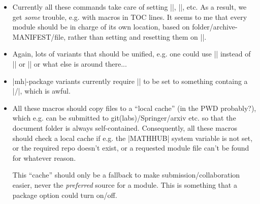 \documentclass{bluenote}
\begin{document}
\begin{itemize}
  \item Currently all these commands take care of setting |\this@module|, |\mh@currentrepos|, etc.
    As a result, we get \emph{some} trouble, e.g. with \sTeX macros in TOC lines. It seems
    to me that every module should be in charge of its own location, based on folder/archive-MANIFEST/file,
    rather than setting and resetting them on ||.

  \item Again, lots of variants that should be unified, e.g. 
    one could use || instead of |\gimport| or |\mhinclude| or what else is around there...
  \item |mh|-package variants currently require |\mh@currentrepos| to be set to something
    containg a |/|, which is awful.
  \item All these macros should copy files to a ``local cache'' (in the PWD probably?), which e.g. 
    can be submitted to git(labs)/Springer/arxiv etc. so that the document folder is always self-contained. 
    Consequently, all these macros should check a local cache if e.g. the |MATHHUB| system variable
    is not set, or the required repo doesn't exist, or a requested module file can't be found
    for whatever reason.

    This ``cache'' should only be a fallback to make submission/collaboration easier, 
    never the \emph{preferred} source for a module. This is something that a package
    option could turn on/off.
\end{itemize}
\end{document}
